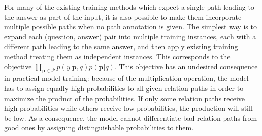 
For many of the existing training methods which expect a single path leading to the answer as part of the input, it is also possible to make them incorporate multiple possible paths when no path annotation is given. The simplest way is to expand each (question, answer) pair into multiple training instances, each with a different path leading to the same answer, and then apply existing training method treating them as independent instances. This corresponds to the objective $\prod_{\mathbf{p}\in\mathcal{P}} p(y|\mathbf{p},q)p(\mathbf{p}|q)$.
This objective has an undesired consequence in practical model training: because of the multiplication operation, the model has to assign equally high probabilities to all given relation paths in order to maximize the product of the probabilities. If only some relation paths receive high probabilities while others receive low probabilities, the production will still be low. As a consequence, the model cannot differentiate bad relation paths from good ones by assigning distinguishable probabilities to them.
 
 \begin{table}[h]\centering
{}
\caption{\fontsize{10}{12}\selectfont We report set accuracy ($\%$) on PQL. Similar to Table \ref{tab:wqsp_cwq}, we use $*$ to highlight the methods which only requires the answer as supervision.}\label{tab:qpl}
\end{table}
 
